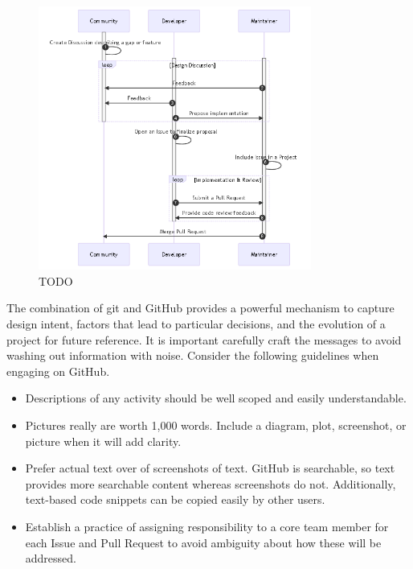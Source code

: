 \documentclass[]{nrel}
\begin{document}
\begin{figure}[htbp] \begin{center}
\includegraphics[width=0.8\textwidth]{mermaid-bfcb6a9556227d6b8158e111ddd0f37e43e4f635.png}
\caption{TODO}
\label{fig:fig3} \end{center} \end{figure}

The combination of git and GitHub provides a powerful mechanism to capture design intent,
factors that lead to particular decisions, and the evolution of a project for future reference.
It is important carefully craft the messages to avoid washing out information with noise.
Consider the following guidelines when engaging on GitHub.

\begin{itemize}
\item Descriptions of any activity should be well scoped and easily understandable.
\item Pictures really are worth 1,000 words. Include a diagram, plot, screenshot, or picture
when it will add clarity.
\item Prefer actual text over of screenshots of text. GitHub is searchable, so text provides more
searchable content whereas screenshots do not. Additionally, text-based code snippets can be
copied easily by other users.
\item Establish a practice of assigning responsibility to a core team member for each Issue and
Pull Request to avoid ambiguity about how these will be addressed.

\end{itemize}
\end{document}
